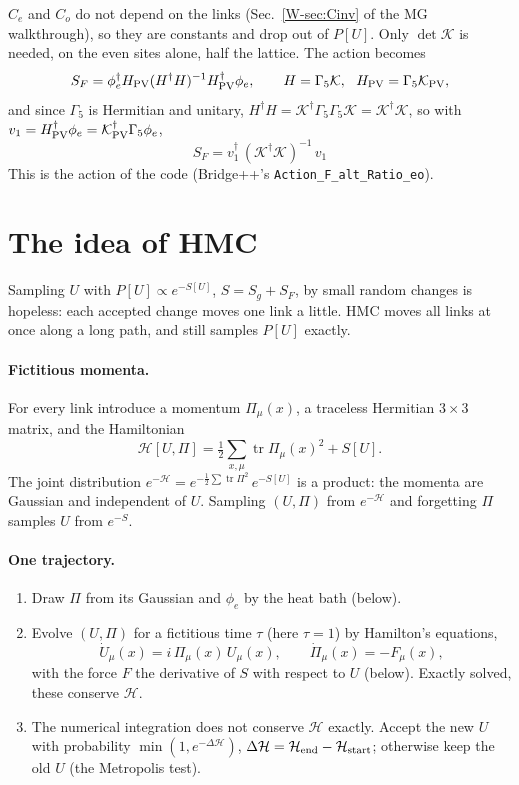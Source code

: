 \documentclass[11pt,a4paper]{article}
\numberwithin{equation}{section}
\newcommand{\dg}{^{\dagger}}
\newcommand{\Gfive}{\Gamma_5}
\newcommand{\Ce}{C_{e}}
\newcommand{\Co}{C_{o}}
\newcommand{\code}[1]{\texttt{\small #1}}
\begin{document}
$\Ce$ and $\Co$ do not depend on the links (Sec.~\ref{W-sec:Cinv} of the MG walkthrough), so they are constants and drop out of
$P[U]$. Only $\det \mathcal K$ is needed, on the even sites alone, half the lattice. The action becomes
\begin{equation}
S_F=\phi_e\dg H_{\rm PV}(H\dg H)^{-1}H_{\rm PV}\dg\phi_e,\qquad H=\Gfive \mathcal K,\ \ H_{\rm PV}=\Gfive \mathcal K_{\rm PV},
\end{equation}
and since $\Gfive$ is Hermitian and unitary, $H\dg H=\mathcal K\dg\Gfive\Gfive \mathcal K=\mathcal K\dg \mathcal K$, so with
$v_1=H_{\rm PV}\dg\phi_e=\mathcal K_{\rm PV}\dg\Gfive\phi_e$,
\begin{equation}
\boxed{\;S_F=v_1\dg\,(\mathcal K\dg \mathcal K)^{-1}\,v_1\;}
\end{equation}
This is the action of the code (Bridge++'s \code{Action\_F\_alt\_Ratio\_eo}).

\section{The idea of HMC}
Sampling $U$ with $P[U]\propto e^{-S[U]}$, $S=S_g+S_F$, by small random changes is hopeless: each
accepted change moves one link a little. HMC moves all links at once along a long path, and still
samples $P[U]$ exactly.

\paragraph{Fictitious momenta.} For every link introduce a momentum $\Pi_\mu(x)$, a traceless
Hermitian $3\times3$ matrix, and the Hamiltonian
\begin{equation}
\mathcal H[U,\Pi]=\tfrac12\sum_{x,\mu}\operatorname{tr}\Pi_\mu(x)^2+S[U] .
\end{equation}
The joint distribution $e^{-\mathcal H}=e^{-\frac12\sum\operatorname{tr}\Pi^2}\,e^{-S[U]}$ is a
product: the momenta are Gaussian and independent of $U$. Sampling $(U,\Pi)$ from $e^{-\mathcal
H}$ and forgetting $\Pi$ samples $U$ from $e^{-S}$.

\paragraph{One trajectory.}
\begin{enumerate}
\item Draw $\Pi$ from its Gaussian and $\phi_e$ by the heat bath (below).
\item Evolve $(U,\Pi)$ for a fictitious time $\tau$ (here $\tau=1$) by Hamilton's equations,
\begin{equation}
\dot U_\mu(x)=i\,\Pi_\mu(x)\,U_\mu(x),\qquad \dot\Pi_\mu(x)=-F_\mu(x),
\end{equation}
with the force $F$ the derivative of $S$ with respect to $U$ (below). Exactly solved, these
conserve $\mathcal H$.
\item The numerical integration does not conserve $\mathcal H$ exactly. Accept the new $U$ with
probability $\min(1,e^{-\Delta\mathcal H})$, $\Delta\mathcal H=\mathcal H_{\rm end}-\mathcal
H_{\rm start}$; otherwise keep the old $U$ (the Metropolis test).
\end{enumerate}
\end{document}
